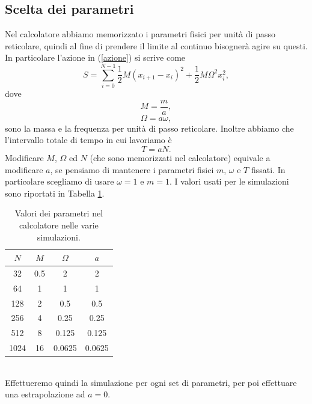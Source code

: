 \documentclass{article}
\begin{document}
\subsection{Scelta dei parametri}

Nel calcolatore abbiamo memorizzato i parametri fisici per unità di passo reticolare, quindi al fine di prendere il limite al continuo bisognerà agire su questi. In particolare l'azione in (\ref{azione}) si scrive come 
\begin{equation}
    S=\sum_{i=0}^{N-1} \frac{1}{2}M\left(x_{i+1}-x_i\right)^2+\frac{1}{2}M\Omega^2x_i^2,
\end{equation}
dove 
\begin{equation}
    M=\frac{m}{a},
\end{equation}
\begin{equation}
    \Omega=a\omega,
\end{equation}
sono la massa e la frequenza per unità di passo reticolare. Inoltre abbiamo che l'intervallo totale di tempo in cui lavoriamo è 
\begin{equation}
    T=aN.
\end{equation}
Modificare $M$, $\Omega$ ed $N$ (che sono memorizzati nel calcolatore) equivale a modificare $a$, se pensiamo di mantenere i parametri fisici $m$, $\omega$ e $T$ fissati. In particolare scegliamo di usare $\omega=1$ e $m=1$. I valori usati per le simulazioni sono riportati in Tabella \ref{tabella vari reticoli}.
\begin{table}[h]
    \centering
    \begin{tabular}{||c c c c||} 
     \hline
     $N$ & $M$ & $\Omega$ & $a$ \\ [0.5ex] 
     \hline\hline
     32 & 0.5 & 2 & 2 \\ 
     64 & 1 & 1 & 1 \\
     128 & 2 & 0.5 & 0.5 \\
     256 & 4 & 0.25 & 0.25 \\ 
     512 & 8 & 0.125 & 0.125 \\ 
     1024 & 16 & 0.0625 & 0.0625 \\ [1ex] 
     \hline
    \end{tabular}
    \caption{Valori dei parametri nel calcolatore nelle varie simulazioni.}
    \label{tabella vari reticoli}
\end{table}\\
Effettueremo quindi la simulazione per ogni set di parametri, per poi effettuare una estrapolazione ad $a=0$. 
\end{document}
